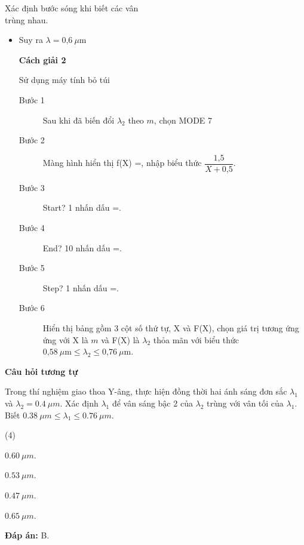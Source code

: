 \begin{dang}{Xác định bước sóng khi biết các vân\\ trùng nhau.}
{\begin{itemize}
	\item Suy ra $\lambda = \text{0,6}\ \mu \text{m}$
	
\textbf{Cách giải 2}

Sử dụng máy tính bỏ túi 

\begin{description}
	\item [Bước 1] Sau khi đã biến đổi $\lambda_2$ theo $m$, chọn MODE 7
	\item [Bước 2] Màng hình hiển thị f(X) =, nhập biểu thức $\dfrac{\text{1,5}}{X+\text{0,5}}.$
	\item [Bước 3] Start? 1  nhấn dấu =.
	\item [Bước 4] End? 10 nhấn dấu =.
	\item [Bước 5]Step? 1 nhấn dấu =.
	\item [Bước 6] Hiển thị bảng gồm 3 cột số thứ tự, X và F(X), chọn giá trị tương ứng ứng với X là $m$ và F(X) là $\lambda_2$ thỏa mãn với biểu thức $\text{0,58}\ \mu \text{m} \leq \lambda_2 \leq \text{0,76}\ \mu \text{m}$.
\end{description}
	
\end{itemize}

\begin{center}
	\textbf{Câu hỏi tương tự}
	\end{center}
	
Trong thí nghiệm giao thoa Y-âng, thực hiện đồng thời hai ánh sáng đơn sắc $ \lambda_{1} $ và $ \lambda_{2} = \SI{0,4}{\mu m} $. Xác định $ \lambda_{1} $ để vân sáng bậc 2 của $ \lambda_{2} $ trùng với vân tối của $ \lambda_{1} $. Biết $ \SI{0,38}{\mu m} \leq \lambda_{1} \leq \SI{0,76}{\mu m} $.
\begin{mcq}(4)
	\item $ \SI{0,60}{\mu m} $.
	\item $ \SI{0,53}{\mu m} $.
	\item $ \SI{0,47}{\mu m} $.
	\item $ \SI{0,65}{\mu m} $.
\end{mcq}

\textbf{Đáp án:} B.
}

\end{dang}

